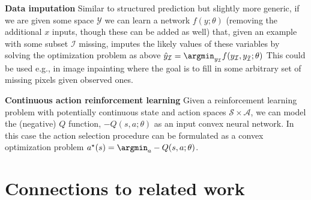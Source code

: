 \textbf{Data imputation}  Similar to structured prediction
but slightly more generic, if we are given some space $\mathcal{Y}$
we can learn a network $f(y;\theta)$ (removing the additional $x$
inputs, though these can be added as well) that, given an example with
some subset $\mathcal{I}$ missing, imputes the likely values of these variables
by solving the optimization problem as above $\hat{y}_\mathcal{I} = \argmin_
{y_\mathcal{I}} f(y_{\mathcal{I}}, y_{\bar {\mathcal{I}}}; \theta)$
This could be used e.g., in image inpainting
where the goal is to fill in some arbitrary set of missing pixels given observed
ones.

\textbf{Continuous action reinforcement learning}
Given a reinforcement learning problem with potentially continuous
state and action spaces $\mathcal
{S} \times \mathcal{A}$,
we can model the (negative) $Q$ function,
$-Q(s,a;\theta)$ as an input convex neural network.  In this case the action
selection procedure can be formulated as a convex optimization problem
$a^\star(s) = \argmin_a -Q(s,a;\theta)$.


\section{Connections to related work}

